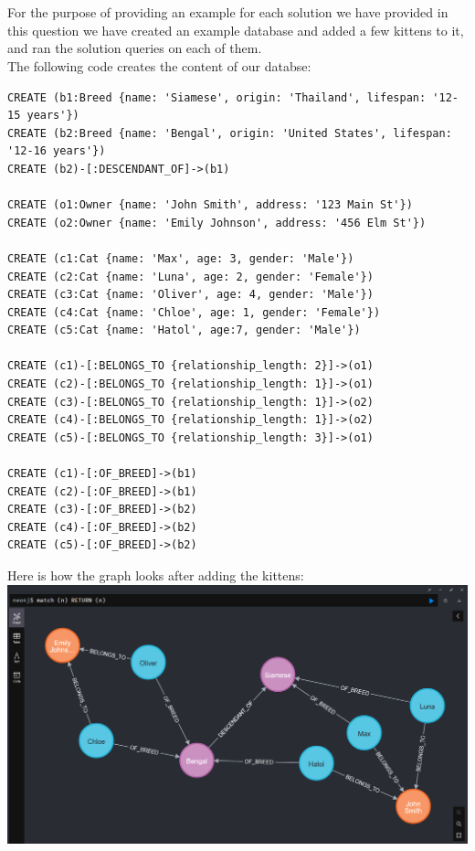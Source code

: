 \documentclass{article}
\begin{document}
\section{}
For the purpose of providing an example for each
solution we have provided in this question we have
created an example database and added a few kittens to it, and ran the
solution queries on each of them.\\
The following code creates the content of our databse:
\begin{lstlisting}
CREATE (b1:Breed {name: 'Siamese', origin: 'Thailand', lifespan: '12-15 years'})
CREATE (b2:Breed {name: 'Bengal', origin: 'United States', lifespan: '12-16 years'})
CREATE (b2)-[:DESCENDANT_OF]->(b1)

CREATE (o1:Owner {name: 'John Smith', address: '123 Main St'})
CREATE (o2:Owner {name: 'Emily Johnson', address: '456 Elm St'})

CREATE (c1:Cat {name: 'Max', age: 3, gender: 'Male'})
CREATE (c2:Cat {name: 'Luna', age: 2, gender: 'Female'})
CREATE (c3:Cat {name: 'Oliver', age: 4, gender: 'Male'})
CREATE (c4:Cat {name: 'Chloe', age: 1, gender: 'Female'})
CREATE (c5:Cat {name: 'Hatol', age:7, gender: 'Male'})

CREATE (c1)-[:BELONGS_TO {relationship_length: 2}]->(o1)
CREATE (c2)-[:BELONGS_TO {relationship_length: 1}]->(o1)
CREATE (c3)-[:BELONGS_TO {relationship_length: 1}]->(o2)
CREATE (c4)-[:BELONGS_TO {relationship_length: 1}]->(o2)
CREATE (c5)-[:BELONGS_TO {relationship_length: 3}]->(o1)

CREATE (c1)-[:OF_BREED]->(b1)
CREATE (c2)-[:OF_BREED]->(b1)
CREATE (c3)-[:OF_BREED]->(b2)
CREATE (c4)-[:OF_BREED]->(b2)
CREATE (c5)-[:OF_BREED]->(b2)
\end{lstlisting}
Here is how the graph looks after adding the kittens:\\
\includegraphics[width=\textwidth]{kittens1.png}
\end{document}
